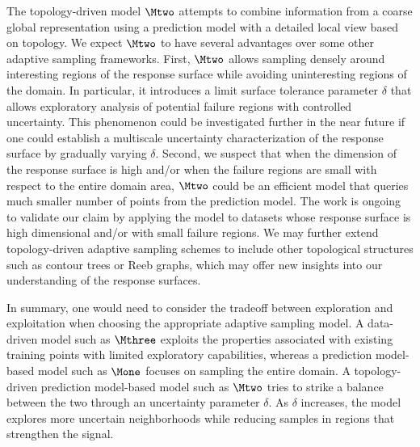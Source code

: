 The topology-driven model $\Mtwo$ attempts to combine information from a coarse global representation using a prediction model with a detailed local view based on topology.
%
We expect $\Mtwo$ to have several advantages over some other adaptive sampling frameworks.
%
First, $\Mtwo$ allows sampling densely around interesting regions of the response surface while avoiding uninteresting regions of the domain.
%
In particular, it introduces a limit surface tolerance parameter $\delta$ that allows exploratory analysis of potential failure regions with controlled uncertainty.
%
This phenomenon could be investigated further in the near future if one could establish a multiscale uncertainty characterization of the response surface by gradually varying $\delta$.
%
Second, we suspect that when the dimension of the response surface is high and/or when the failure regions are small with respect to the entire domain area, $\Mtwo$ could be an efficient model that queries much smaller number of points from the prediction model.
%
The work is ongoing to validate our claim by applying the model to datasets whose response surface is high dimensional and/or with small failure regions.
%
We may further extend topology-driven adaptive sampling schemes to include other topological structures such as contour trees or Reeb graphs, which may offer new insights into our understanding of the response surfaces.

In summary, one would need to consider the tradeoff between exploration and exploitation when choosing the appropriate adaptive sampling model.
%
A data-driven model such as $\Mthree$ exploits the properties associated with existing training points with limited exploratory capabilities, whereas a prediction model-based model such as $\Mone$ focuses on sampling the entire domain.
%
A topology-driven prediction model-based model such as $\Mtwo$ tries to strike a balance between the two through an uncertainty parameter $\delta$.
%
As $\delta$ increases, the model explores more uncertain neighborhoods while reducing samples in regions that strengthen the signal.


